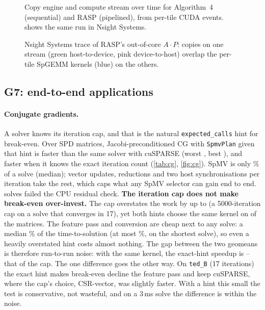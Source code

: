 \begin{figure}[t]
\centering{}
\caption{Copy engine and compute stream over time for Algorithm~4 (sequential) and RASP (pipelined), from per-tile CUDA
events.  shows the same run in Nsight Systems.}\label{fig:timeline}
\end{figure}

\begin{figure}[t]
\centering{}
\caption{Nsight Systems trace of RASP's out-of-core $A\cdot P$: copies on one stream (green host-to-device, pink
device-to-host) overlap the per-tile SpGEMM kernels (blue) on the others.}\label{fig:nsys}
\end{figure}

\subsection{G7: end-to-end applications}\label{sec:eval-g7}
\paragraph{Conjugate gradients.} A solver knows its iteration cap, and that is the natural \texttt{expected\_calls}
hint for break-even. Over  SPD matrices, Jacobi-preconditioned CG with \texttt{SpmvPlan} given that
hint is \x{} faster than the same solver with cuSPARSE (worst \x,
best \x), and \x{} faster when it knows the exact iteration count
(\cref{tab:cg}, \cref{fig:cg}). SpMV is only \% of a solve (median); vector updates, reductions
and two host synchronisations per iteration take the rest, which caps what any SpMV selector can gain end to end.
 solves failed the CPU residual check.
\textbf{The iteration cap does not make break-even over-invest.} The cap overstates the work by up to
\x{} (a 5000-iteration cap on a solve that converges in 17), yet both hints choose the
same kernel on  of the  matrices. The feature pass and conversion are cheap
next to any solve: a median \% of the time-to-solution (at most
\%, on the shortest solve), so even a heavily overstated hint costs almost nothing. The gap
between the two geomeans is therefore run-to-run noise: with the same kernel, the exact-hint speedup is
--\x{} that of the cap. The one difference goes the other way.
On \texttt{ted\_B} (17 iterations) the exact hint makes break-even decline the feature pass and keep cuSPARSE, where
the cap's choice, CSR-vector, was slightly faster. With a hint this small the test is conservative, not wasteful, and on
a 3\,ms solve the difference is within the noise.

